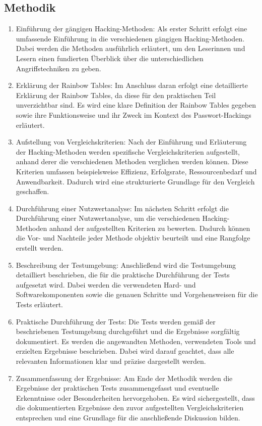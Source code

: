 \subsection{Methodik}
\begin{enumerate}
  \item Einführung der gängigen Hacking-Methoden: Als erster Schritt erfolgt eine umfassende Einführung in die verschiedenen gängigen Hacking-Methoden. Dabei werden die Methoden ausführlich erläutert, um den Leserinnen und Lesern einen fundierten Überblick über die unterschiedlichen Angriffstechniken zu geben.
  \item Erklärung der Rainbow Tables: Im Anschluss daran erfolgt eine detaillierte Erklärung der Rainbow Tables, da diese für den praktischen Teil unverzichtbar sind. Es wird eine klare Definition der Rainbow Tables gegeben sowie ihre Funktionsweise und ihr Zweck im Kontext des Passwort-Hackings erläutert.
  \item Aufstellung von Vergleichskriterien: Nach der Einführung und Erläuterung der Hacking-Methoden werden spezifische Vergleichskriterien aufgestellt, anhand derer die verschiedenen Methoden verglichen werden können. Diese Kriterien umfassen beispielsweise Effizienz, Erfolgsrate, Ressourcenbedarf und Anwendbarkeit. Dadurch wird eine strukturierte Grundlage für den Vergleich geschaffen.
  \item Durchführung einer Nutzwertanalyse: Im nächsten Schritt erfolgt die Durchführung einer Nutzwertanalyse, um die verschiedenen Hacking-Methoden anhand der aufgestellten Kriterien zu bewerten. Dadurch können die Vor- und Nachteile jeder Methode objektiv beurteilt und eine Rangfolge erstellt werden.
  \item Beschreibung der Testumgebung: Anschließend wird die Testumgebung detailliert beschrieben, die für die praktische Durchführung der Tests aufgesetzt wird. Dabei werden die verwendeten Hard- und Softwarekomponenten sowie die genauen Schritte und Vorgehensweisen für die Tests erläutert.
  \item Praktische Durchführung der Tests: Die Tests werden gemäß der beschriebenen Testumgebung durchgeführt und die Ergebnisse sorgfältig dokumentiert. Es werden die angewandten Methoden, verwendeten Tools und erzielten Ergebnisse beschrieben. Dabei wird darauf geachtet, dass alle relevanten Informationen klar und präzise dargestellt werden.
  \item Zusammenfassung der Ergebnisse: Am Ende der Methodik werden die Ergebnisse der praktischen Tests zusammengefasst und eventuelle Erkenntnisse oder Besonderheiten hervorgehoben. Es wird sichergestellt, dass die dokumentierten Ergebnisse den zuvor aufgestellten Vergleichskriterien entsprechen und eine Grundlage für die anschließende Diskussion bilden.
\end{enumerate}
